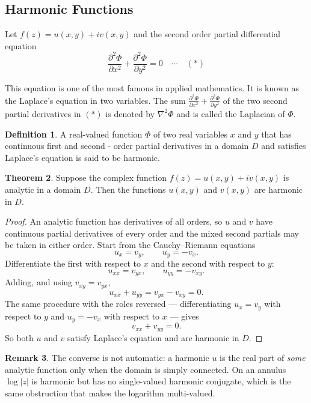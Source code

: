 \documentclass[11pt,a4paper]{article}
\theoremstyle{definition}
\newtheorem{thm}{Theorem}[section]
\newtheorem{definition}[thm]{Definition}
\newtheorem{remark}[thm]{Remark}
\begin{document}
{\color[wave]{485}\subsection{Harmonic Functions}}
Let $f(z) = u(x,y) + iv(x,y)$ and the  second order partial differential equation
$$\boxed{\frac{\partial^2\Phi}{\partial x^2} + \frac{\partial^2\Phi}{\partial y^2} = 0 \quad \cdots\quad (*)}$$

This equation is one of the most famous in applied mathematics. It is known as the Laplace's equation in two variables. The sum $\frac{\partial^2\Phi}{\partial x^2} + \frac{\partial^2\Phi}{\partial y^2}$ of the two second partial derivatives in $(*)$ is denoted by $\nabla^2\Phi$ and is called the Laplacian of $\Phi$.\\



\begin{definition}
A real-valued function $\Phi$ of two real variables $x$ and $y$ that has continuous first and second - order partial derivatives in a domain $D$ and satisfies Laplace's equation is said to be harmonic.
\end{definition}

\begin{thm}
Suppose the complex function $f(z)  = u(x,y) + iv(x,y)$ is analytic in a domain $D$. Then the functions $u(x,y)$ and $v(x,y)$ are harmonic in $D$.
\end{thm}

\begin{proof}
An analytic function has derivatives of all orders, so $u$ and $v$ have
continuous partial derivatives of every order and the mixed second partials may
be taken in either order. Start from the Cauchy--Riemann equations
$$u_x=v_y,\qquad u_y=-v_x .$$
Differentiate the first with respect to $x$ and the second with respect to $y$:
$$u_{xx}=v_{yx},\qquad u_{yy}=-v_{xy} .$$
Adding, and using $v_{xy}=v_{yx}$,
$$u_{xx}+u_{yy}=v_{yx}-v_{xy}=0 .$$
The same procedure with the roles reversed --- differentiating $u_x=v_y$ with
respect to $y$ and $u_y=-v_x$ with respect to $x$ --- gives
$$v_{xx}+v_{yy}=0 .$$
So both $u$ and $v$ satisfy Laplace's equation and are harmonic in $D$.
\end{proof}

\begin{remark}
The converse is not automatic: a harmonic $u$ is the real part of \emph{some}
analytic function only when the domain is simply connected. On an annulus
$\log\left|z\right|$ is harmonic but has no single-valued harmonic conjugate,
which is the same obstruction that makes the logarithm multi-valued.
\end{remark}
\end{document}
